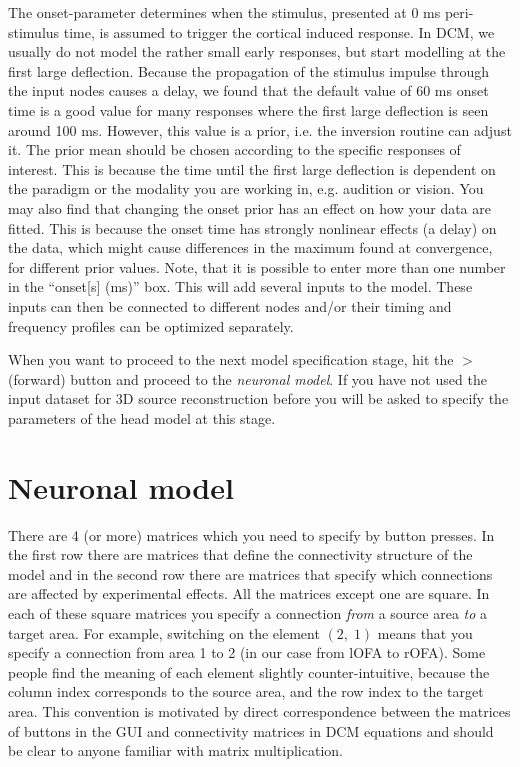The onset-parameter determines when the stimulus, presented at 0 ms peri-stimulus time, is assumed to trigger the cortical induced response. In DCM, we usually do not model the rather small early responses, but start modelling at the first large deflection. Because the propagation of the stimulus impulse through the input nodes causes a delay, we found that the default value of 60
ms onset time is a good value for many responses where the first large deflection is seen around 100 ms. However, this value is a
prior, i.e. the inversion routine can adjust it. The prior mean should be chosen according to the specific responses of interest. This is because the time until the first large deflection is dependent on the paradigm or the modality you are working in, e.g. audition or vision. You may also find that changing the onset prior has an effect on how your data are
fitted. This is because the onset time has strongly nonlinear effects (a delay) on the data, which might cause differences in the maximum found at convergence, for different prior values. Note, that it is possible to enter more than one number in the ``onset[s] (ms)'' box. This will add several inputs to the model. These inputs can then be connected to different nodes and/or their timing and frequency profiles can be optimized separately.

When you want to proceed to the next model specification stage, hit the $>$ (forward) button and proceed to the \textit{neuronal model}. If you have not used the input dataset for 3D source reconstruction before you will be asked to specify the parameters of the head model at this stage.

\section{Neuronal model}
There are 4 (or more) matrices which you need to specify by button presses. In the first row there are matrices that define the connectivity structure of the model and in the second row there are matrices that specify which connections are affected by experimental effects. All the matrices except one are square. In each of these square matrices you specify a connection \textit{from} a source area \textit{to} a target area. For example, switching on the element $(2,\;1)$ means that you specify a connection from area 1 to 2 (in our case from lOFA to rOFA). Some people find the meaning of each element slightly counter-intuitive, because the column index corresponds to the source area, and the row index to the target area. This convention is motivated by direct correspondence between the matrices of buttons in the GUI and connectivity matrices in DCM equations and should be clear to anyone familiar with matrix multiplication.

